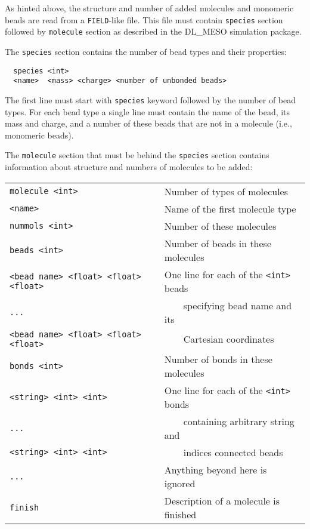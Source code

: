 As hinted above, the structure and number of added molecules and monomeric
beads are read from a \texttt{FIELD}-like file. This file must contain
\texttt{species} section followed by \texttt{molecule} section as described
in the DL\_MESO simulation package.

The \texttt{species} section contains the number of bead types and their
properties:
\begin{verbatim}
  species <int>
  <name>  <mass> <charge> <number of unbonded beads>
\end{verbatim}
The first line must start with \texttt{species} keyword followed by the
number of bead types. For each bead type a single line must contain the name of
the bead, its mass and charge, and a number of these beads that are not
in a molecule (i.e., monomeric beads).

The \texttt{molecule} section that must be behind the \texttt{species}
section contains information about structure and numbers of molecules to be
added:

\noindent
\begin{longtable}{ll}
  \texttt{molecule <int>} & Number of types of molecules \\
  \texttt{<name>} & Name of the first molecule type \\
  \texttt{nummols <int>} & Number of these molecules \\
  \texttt{beads <int>} & Number of beads in these molecules \\
  \texttt{<bead name> <float> <float> <float>} & One line for each of the \texttt{<int>} beads \\
  \texttt{...} & \ \ \ \ specifying bead name and its \\
  \texttt{<bead name> <float> <float> <float>} & \ \ \ \ Cartesian coordinates \\
  \texttt{bonds <int>} & Number of bonds in these molecules \\
  \texttt{<string> <int> <int>} & One line for each of the \texttt{<int>} bonds \\
  \texttt{...} & \ \ \ \ containing arbitrary string and \\
  \texttt{<string> <int> <int>} & \ \ \ \ indices connected beads \\
  \texttt{...} & Anything beyond here is ignored \\
  \texttt{finish} & Description of a molecule is finished \\
\end{longtable}

